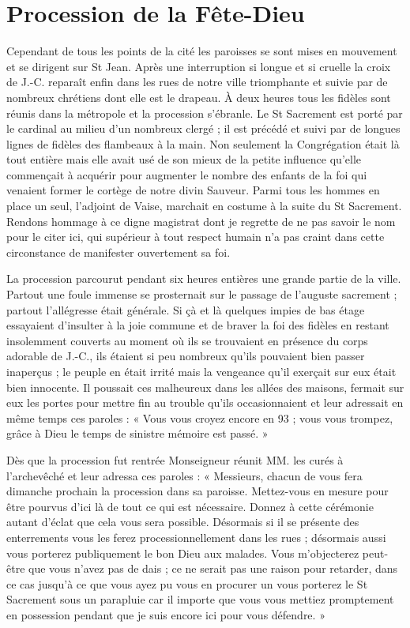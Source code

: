 \section*{Procession de la Fête-Dieu}
Cependant de tous les points de la cité les paroisses se sont mises en mouvement et se dirigent sur St Jean. Après une interruption si longue et si cruelle la croix de J.-C. reparaît enfin dans les rues de notre ville triomphante et suivie par de nombreux chrétiens dont elle est le drapeau. À deux heures tous les fidèles sont réunis dans la métropole et la procession s'ébranle. Le St Sacrement est porté par le cardinal au milieu d'un nombreux clergé ; il est précédé et suivi par de longues lignes de fidèles des flambeaux à la main. Non seulement la Congrégation était là tout entière mais elle avait usé de son mieux de la petite influence qu'elle commençait à acquérir pour augmenter le nombre des enfants de la foi qui venaient former le cortège de notre divin Sauveur. Parmi tous les hommes en place un seul, l'adjoint de Vaise, marchait en costume à la suite du St Sacrement. Rendons hommage à ce digne magistrat dont je regrette de ne pas savoir le nom pour le citer ici, qui supérieur à tout respect humain n'a pas craint dans cette circonstance de manifester ouvertement sa foi.

La procession parcourut pendant six heures entières une grande partie de la ville. Partout une foule immense se prosternait sur le passage de l'auguste sacrement ; partout l'allégresse était générale. Si çà et là quelques impies de bas étage essayaient d'insulter à la joie
commune et de braver la foi des fidèles en restant insolemment couverts au moment où ils se trouvaient en présence du corps adorable de J.-C., ils étaient si peu nombreux qu'ils pouvaient bien passer inaperçus ; le peuple en était irrité mais la vengeance qu'il exerçait sur eux était bien innocente. Il poussait ces malheureux dans les allées des maisons, fermait sur eux les portes pour mettre fin au trouble qu'ils occasionnaient et leur adressait en même temps ces paroles : « Vous vous croyez encore en 93 ; vous vous trompez, grâce à Dieu le temps de sinistre mémoire est passé. »

Dès que la procession fut rentrée Monseigneur réunit MM. les curés à l'archevêché et leur adressa ces paroles : « Messieurs, chacun de vous fera dimanche prochain la procession dans sa paroisse. Mettez-vous en mesure pour être pourvus d'ici là de tout ce qui est nécessaire. Donnez à cette cérémonie autant d'éclat que cela vous sera possible. Désormais si il se présente des enterrements vous les ferez processionnellement dans les rues ; désormais aussi vous porterez publiquement le bon Dieu aux malades. Vous m'objecterez peut-être que vous n'avez pas de dais ; ce ne serait pas une raison pour retarder, dans ce cas jusqu'à ce que vous ayez pu vous en procurer un vous porterez le St Sacrement sous un parapluie car il importe que vous vous mettiez promptement en possession pendant que je suis encore ici pour vous défendre. »

